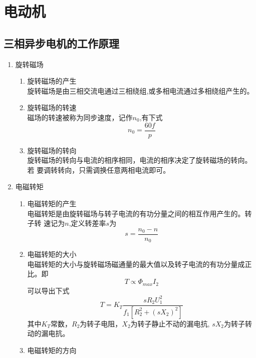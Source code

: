 \section{电动机}
\subsection{三相异步电机的工作原理}

\begin{enumerate}
    \item 旋转磁场
    \begin{enumerate}
        \item 旋转磁场的产生\\
        旋转磁场是由三相交流电通过三相绕组,或多相电流通过多相绕组产生的。
        \item 旋转磁场的转速\\
        磁场的转速被称为同步速度，记作$n_0$,有下式
        \begin{equation}
            n_0=\frac{60f}{p}
        \end{equation}
        \item 旋转磁场的转向\\
        旋转磁场的转向与电流的相序相同，电流的相序决定了旋转磁场的转向。若
        要调转转向，只需调换任意两相电流即可。
    \end{enumerate}
    \item 电磁转矩
    \begin{enumerate}
        \item 电磁转矩的产生 \\
        电磁转矩是由旋转磁场与转子电流的有功分量之间的相互作用产生的。转子转
        速记为$n$,定义转差率$s$为
        \begin{equation}
            s=\frac{n_0-n}{n_0}
        \end{equation}
        \item 电磁转矩的大小 \\
        电磁转矩的大小与旋转磁场磁通量的最大值以及转子电流的有功分量成正比。即
        \begin{equation}
            T\propto\varPhi_{max}I_{2}
        \end{equation}
        可以导出下式
        \begin{equation}
            T=K_T\frac{sR_2U_1^2}{f_1[R_2^2+(sX_2)^2]}
        \end{equation}
        其中$K_T$常数，$R_2$为转子电阻，$X_2$为转子静止不动的漏电抗,
        $sX_2$为转子转动的漏电抗。
        \item 电磁转矩的方向 \\

\end{enumerate}
\end{enumerate}

